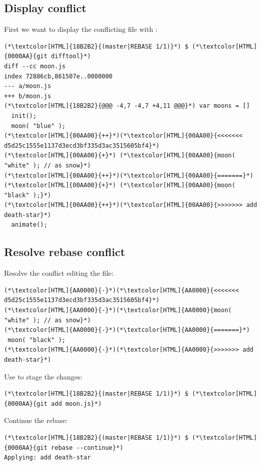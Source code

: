 \subsection{Display conflict}
\begin{frame}[fragile]
  \subslidetitle
  First we want to display the conflicting file with :
  \begin{lstlisting}
(*\textcolor[HTML]{18B2B2}{(master|REBASE 1/1)}*) $ (*\textcolor[HTML]{0000AA}{git difftool}*)
diff --cc moon.js
index 72886cb,861507e..0000000
--- a/moon.js
+++ b/moon.js
(*\textcolor[HTML]{18B2B2}{@@@ -4,7 -4,7 +4,11 @@@}*) var moons = []
  init();
  moon( "blue" );
(*\textcolor[HTML]{00AA00}{++}*)(*\textcolor[HTML]{00AA00}{<<<<<<< d5d25c1555e1137d3ecd3bf335d3ac3515605bf4}*)
(*\textcolor[HTML]{00AA00}{+}*) (*\textcolor[HTML]{00AA00}{moon( "white" ); // as snow}*)
(*\textcolor[HTML]{00AA00}{++}*)(*\textcolor[HTML]{00AA00}{=======}*)
(*\textcolor[HTML]{00AA00}{+}*) (*\textcolor[HTML]{00AA00}{moon( "black" );}*)
(*\textcolor[HTML]{00AA00}{++}*)(*\textcolor[HTML]{00AA00}{>>>>>>> add death-star}*)
  animate();
\end{lstlisting}
\end{frame}

\subsection{Resolve rebase conflict}
\begin{frame}[fragile]
  \subslidetitle
  Resolve the conflict editing the  file:

  \begin{lstlisting}
(*\textcolor[HTML]{AA0000}{-}*)(*\textcolor[HTML]{AA0000}{<<<<<<< d5d25c1555e1137d3ecd3bf335d3ac3515605bf4}*)
(*\textcolor[HTML]{AA0000}{-}*)(*\textcolor[HTML]{AA0000}{moon( "white" ); // as snow}*)
(*\textcolor[HTML]{AA0000}{-}*)(*\textcolor[HTML]{AA0000}{=======}*)
 moon( "black" );
(*\textcolor[HTML]{AA0000}{-}*)(*\textcolor[HTML]{AA0000}{>>>>>>> add death-star}*)
\end{lstlisting}

  \vspace{1em}
  Use  to stage the changes:
  \begin{lstlisting}
(*\textcolor[HTML]{18B2B2}{(master|REBASE 1/1)}*) $ (*\textcolor[HTML]{0000AA}{git add moon.js}*)
\end{lstlisting}

  Continue the rebase:
  \begin{lstlisting}
(*\textcolor[HTML]{18B2B2}{(master|REBASE 1/1)}*) $ (*\textcolor[HTML]{0000AA}{git rebase --continue}*)
Applying: add death-star
\end{lstlisting}
\end{frame}

